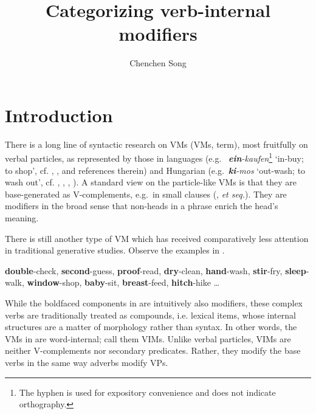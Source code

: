\documentclass[output=paper]{langsci/langscibook}
\author{Chenchen Song\affiliation{University of Cambridge}}
\title{Categorizing verb-internal modifiers}
\begin{document}
\glsresetall

\section{Introduction}\label{sec1}

There is a long line of syntactic research on \glsdesc{VM}s
(\glspl{VM},  term), most fruitfully on verbal particles,
as represented by those in  languages (e.g.\ 
\textit{\textbf{ein}-kaufen}\footnote{The hyphen is used for expository
convenience and does not indicate orthography.} `in-buy; to shop', cf.
\citealt{DeheEtal2002}, \citealt{Haiden2006}, and references therein) and
Hungarian (e.g.\ \textit{\textbf{ki}-mos} `out-wash; to wash out', cf.
\citealt{Kiss1987}, \citeyear{Kiss2002}, \citeyear{Kiss2008},
\citealt{Hegedus2013}). A standard view on the particle-like \glspl{VM} is that they
are base-generated as V-complements, e.g.\ in small clauses
(\citealt{Taraldsen1983}, \citealt{Kayne1985} \emph{et seq.}). They are
modifiers in the broad sense that non-heads in a phrase enrich the head's
meaning.

There is still another type of \gls{VM} which has received comparatively less
attention in traditional generative studies. Observe the examples in
.

\ea\label{ex:mod}
    \textbf{double}-check, \textbf{second}-guess, \textbf{proof}-read,
    \textbf{dry}-clean, \textbf{hand}-wash, \textbf{stir}-fry,
    \textbf{sleep}-walk, \textbf{window}-shop, \textbf{baby}-sit,
    \textbf{breast}-feed, \textbf{hitch}-hike \dots
\z

\noindent While the boldfaced components in  are intuitively also
modifiers, these complex verbs are traditionally treated as compounds, i.e.
lexical items, whose internal structures are a matter of morphology rather than
syntax. In other words, the \glspl{VM} in  are word-internal; call them
\glspl{VIM}. Unlike verbal particles, \glspl{VIM} are neither V-complements nor
secondary predicates. Rather, they modify the base verbs in the same way
adverbs modify VPs.
\end{document}
